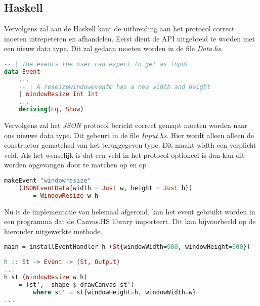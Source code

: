 \subsection{Haskell}
Vervolgens zal aan de Haskell kant de uitbreiding aan het protocol correct moeten intrepeteren en afhandelen. Eerst dient de API uitgebreid te worden met een nieuw data type. Dit zal gedaan moeten worden in de file \emph{Data.hs}.
\begin{lstlisting}[language=Haskell]
-- | The events the user can expect to get as input
data Event
    ...
    -- | A reseizewindoweventm has a new width and height
    | WindowResize Int Int
    ...
    deriving(Eq, Show)
\end{lstlisting}
Vervolgens zal het \emph{JSON} protocol bericht correct gemapt moeten worden naar ons nieuwe data type. Dit gebeurt in de file \emph{Input.hs}. Hier wordt alleen alleen de  constructor gematched van het teruggegeven  type. Dit maakt width een verplicht veld. Als het wenselijk is dat een veld in het protocol optioneel is dan kan dit worden opgevangen door te matchen op  en op .
\begin{lstlisting}[language=Haskell]
makeEvent "windowresize"
    (JSONEventData{width = Just w, height = Just h})
        = WindowResize w h
\end{lstlisting}
Nu is de implementatie van  helemaal afgerond, kan het event gebruikt worden in een programma dat de Canvas.HS library importeert. Dit kan bijvoorbeeld op de hieronder uitgewerkte methode.
\begin{lstlisting}[language=Haskell]
main = installEventHandler h (St{windowWidth=900, windowHeight=600})
 
h :: St -> Event -> (St, Output)
...
h st (WindowResize w h)
    = (st',  shape $ drawCanvas st')
        where st' = st{windowHeight=h, windowWidth=w}
...
\end{lstlisting}


